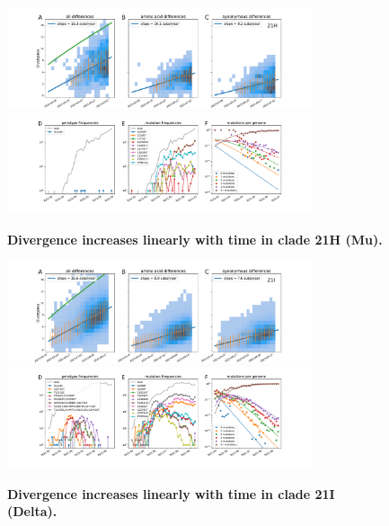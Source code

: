 \begin{figure}[h]
    \includegraphics[width=0.8\textwidth]{figures/rtt/21H_rtt.pdf}
    \includegraphics[width=0.8\textwidth]{figures/counts/21H_counts.pdf}
    \caption{{\bf Divergence increases linearly with time in clade 21H (Mu).}
    \label{fig:21H_divergence}}
\end{figure}

\begin{figure}[h]
    \includegraphics[width=0.8\textwidth]{figures/rtt/21I_rtt.pdf}
    \includegraphics[width=0.8\textwidth]{figures/counts/21I_counts.pdf}
    \caption{{\bf Divergence increases linearly with time in clade 21I (Delta).}
    \label{fig:21I_divergence}}
\end{figure}

